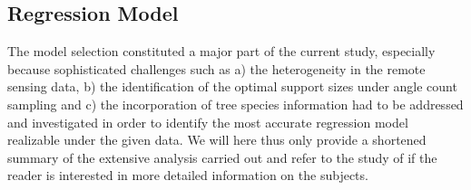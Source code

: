


\subsection{Regression Model}
\label{sec:regmod}

The model selection constituted a major part of the current study, especially because sophisticated challenges such as a) the heterogeneity in the remote sensing data, b) the identification of the optimal support sizes under angle count sampling and c) the incorporation of tree species information had to be addressed and investigated in order to identify the most accurate regression model realizable under the given data. We will here thus only provide a shortened summary of the extensive analysis carried out and refer to the study of \citet{hill2017a} if the reader is interested in more detailed information on the subjects.\par


